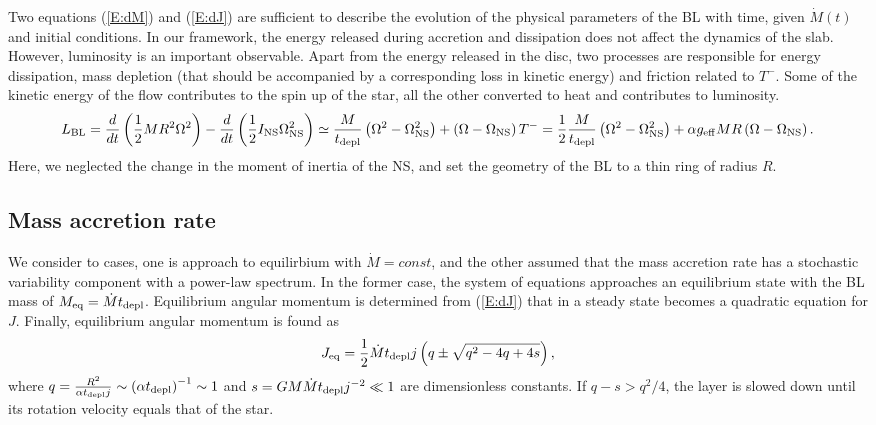 \documentclass[useAMS,usenatbib,onecolumn,12pt]{mnras}
\begin{document}
Two equations (\ref{E:dM}) and (\ref{E:dJ}) are sufficient to describe the evolution of the physical parameters of the BL with time, given $\dot{M}(t)$ and initial conditions.
In our framework, the energy released during accretion and dissipation does not affect the dynamics of the slab. However, luminosity is an important observable. Apart from the energy released in the disc,  two processes are responsible for energy dissipation, mass depletion (that should be accompanied by a corresponding loss in kinetic energy) and friction related to $T^-$.
Some of the kinetic energy of the flow contributes to the spin up of the star, all the other converted to heat and contributes to luminosity. 
\begin{equation}\label{E:Ltot}
  L_{\rm BL} =\frac{d}{dt}\left( \frac{1}{2} MR^2 \Omega^2\right) -  \frac{d}{dt}\left( \frac{1}{2} I_{\rm NS} \Omega_{\rm NS}^2\right) \simeq 
  \frac{M}{t_{\rm depl}} \left( \Omega^2 -\Omega_{\rm NS}^2\right) +  \left( \Omega - \Omega_{\rm NS}\right) T^- = \frac{1}{2} \frac{M}{t_{\rm depl}} \left( \Omega^2 -\Omega_{\rm NS}^2\right) + \alpha g_{\rm eff} MR \left( \Omega - \Omega_{\rm NS}\right).
\end{equation}
Here, we neglected the change in the moment of inertia of the NS, and set the geometry of the BL to a thin ring of radius $R$. 

\subsection{Mass accretion rate}

We consider to cases, one is approach to equilirbium with $\dot{M} = const$, and the other assumed that the mass accretion rate has a stochastic variability component with a power-law spectrum.
In the former case, the system of equations approaches an equilibrium state with the BL mass of $M_{\rm eq} = \dot{M}t_{\rm depl}$. Equilibrium angular momentum is determined from (\ref{E:dJ}) that in a steady state becomes a quadratic equation for $J$. Finally, equilibrium angular momentum is found as
\begin{equation}
  J_{\rm eq} = \frac{1}{2}\dot{M} t_{\rm depl} j \left(  q \pm \sqrt{q^2 - 4q+4s}\right),
\end{equation}
where $q = \frac{R^2}{\alpha t_{\rm depl} j}\sim \left( \alpha t_{\rm depl}\right)^{-1} \sim 1$ and $s = GM\dot{M} t_{\rm depl} j^{-2} \ll 1$ are dimensionless constants. If $q-s > q^2/4$, the layer is slowed down until its rotation velocity equals that of the star.
\end{document}
